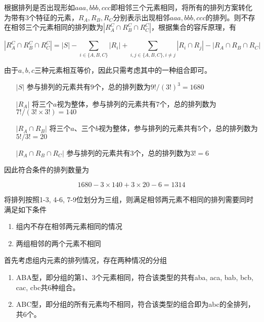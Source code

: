 \documentclass{../notes}
\begin{document}
    \begin{subquestions}
        \item 根据排列是否出现形如$aaa, bbb, ccc$即相邻三个元素相同，将所有的排列方案转化为带有3个特征的元素，$R_A, R_B, R_C$分别表示出现相邻$aaa, bbb, ccc$的排列。则不存在相邻三个元素相同的排列数为$\left|R_A^C\cap R_B^C\cap R_C^C\right|$，根据集合的容斥原理，有

        \begin{equation}
            \left|R_A^C\cap R_B^C\cap R_C^C\right| = |S| - \sum_{i\in \{A,B,C\}}|R_i| + \sum_{i, j\in \{A,B,C\}, i\not = j}|R_i\cap R_j| - |R_A\cap R_B\cap R_C|
        \end{equation}

        由于$a, b, c$三种元素相互等价，因此只需考虑其中的一种组合即可。

        \begin{enumerate}
            \item[$|S|$] 参与排列的元素共有9个，总的排列数为$9! / (3!)^3 = 1680$
            \item[$|R_A|$] 将三个$a$视为整体，参与排列的元素共有7个，总的排列数为$7! / \left(3!\times 3!\right) = 140$
            \item[$|R_A\cap R_B|$] 将三个$a$、三个$b$视为整体，参与排列的元素共有5个，总的排列数为$5! / 3! = 20$
            \item[$|R_A\cap R_B\cap R_C|$] 参与排列的元素共有3个，总的排列数为$3!=6$
        \end{enumerate}

        因此符合条件的排列数量为

        \begin{equation*}
            1680 - 3\times 140 + 3\times 20 - 6 = 1314
        \end{equation*}

        \item 将排列按照1-3, 4-6, 7-9位划分为三组，则满足相邻两元素不相同的排列需要同时满足如下条件

        \begin{enumerate}
            \item 组内不存在相邻两元素相同的情况
            \item 两组相邻的两个元素不相同
        \end{enumerate}

        首先考虑组内元素的排列情况，存在两种情况的分组

        \begin{enumerate}
            \item ABA型，即分组的第1、3个元素相同，符合该类型的共有aba, aca, bab, bcb, cac, cbc共6种组合。
            \item ABC型，即分组的所有元素均不相同，符合该类型的组合即为abc的全排列，共6个。
        \end{enumerate}


\end{subquestions}
\end{document}
